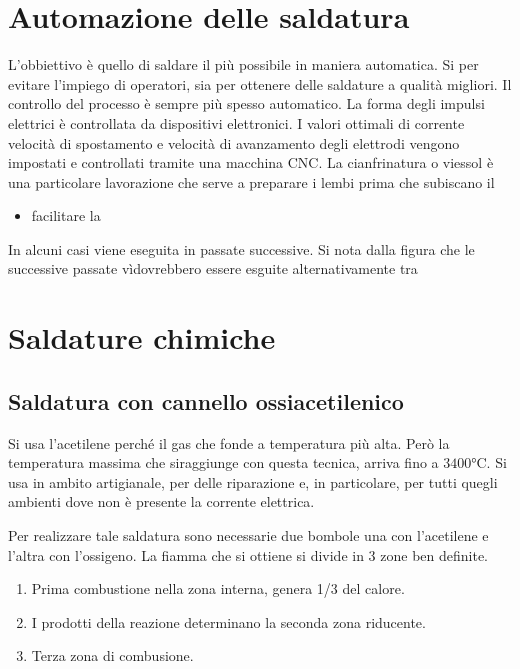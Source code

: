 \section{Automazione delle saldatura}
L'obbiettivo è quello di saldare il più possibile in maniera automatica.
Si per evitare l'impiego di operatori, sia per ottenere delle saldature a qualità migliori.
Il controllo del processo è sempre più spesso automatico. La forma degli impulsi elettrici è controllata da dispositivi elettronici.
I valori ottimali di corrente velocità di spostamento e velocità di avanzamento degli elettrodi vengono impostati e controllati tramite una macchina \ac{CNC}.
La cianfrinatura o viessol è una particolare lavorazione che serve a preparare i lembi prima che subiscano il
\begin{itemize}
\item facilitare la \todo{\\aggiungi}
\end{itemize}

In alcuni casi viene eseguita in passate successive.
Si nota dalla figura  che le successive passate vìdovrebbero essere esguite alternativamente tra 

\section{Saldature chimiche}
\subsection{Saldatura con cannello ossiacetilenico}
Si usa l'acetilene perché il gas che fonde a temperatura più alta.
Però la temperatura massima che siraggiunge con questa tecnica, arriva fino a $3400\unit{\celsius}$. Si usa in ambito artigianale, per delle riparazione e, in particolare, per tutti quegli ambienti dove non è presente la corrente elettrica.

Per realizzare tale saldatura sono necessarie due bombole una con l'acetilene e l'altra con l'ossigeno.
La fiamma che si ottiene si divide in 3 zone ben definite.
\begin{enumerate}
\item Prima combustione nella zona interna, genera 1/3 del calore.
\item I prodotti della reazione determinano la seconda zona riducente.
\item Terza zona di combusione.
\end{enumerate}

